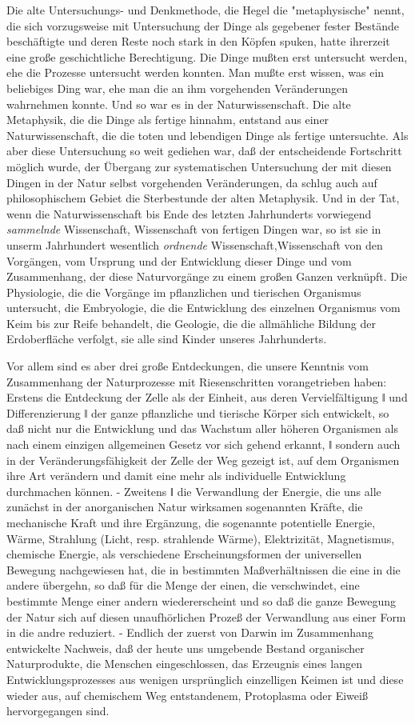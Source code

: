Die alte Untersuchungs- und Denkmethode, die Hegel die
"metaphysische" nennt, die sich vorzugsweise mit Untersuchung der Dinge
als gegebener fester Bestände beschäftigte und deren Reste noch stark in
den Köpfen spuken, hatte ihrerzeit eine große geschichtliche
Berechtigung. Die Dinge mußten erst untersucht werden, ehe die Prozesse
untersucht werden konnten. Man mußte erst wissen, was ein beliebiges
Ding war, ehe man die an ihm vorgehenden Veränderungen wahrnehmen
konnte. Und so war es in der Naturwissenschaft. Die alte Metaphysik, die
die Dinge als fertige hinnahm, entstand aus einer Naturwissenschaft, die
die toten und lebendigen Dinge als fertige untersuchte. Als aber diese
Untersuchung so weit gediehen war, daß der entscheidende Fortschritt
möglich wurde, der Übergang zur systematischen Untersuchung der mit
diesen Dingen in der Natur selbst vorgehenden Veränderungen, da schlug
auch auf philosophischem Gebiet die Sterbestunde der alten Metaphysik.
Und in der Tat, wenn die Naturwissenschaft bis Ende des letzten
Jahrhunderts vorwiegend \emph{sammelnde }Wissenschaft, Wissenschaft von
fertigen Dingen war, so ist sie in unserm Jahrhundert
wesentlich \emph{ordnende} Wissenschaft,Wissenschaft von den Vorgängen,
vom Ursprung und der Entwicklung dieser Dinge und vom Zusammenhang, der
diese Naturvorgänge zu einem großen Ganzen verknüpft. Die Physiologie,
die die Vorgänge im pflanzlichen und tierischen Organismus untersucht,
die Embryologie, die die Entwicklung des einzelnen Organismus vom Keim
bis zur Reife behandelt, die Geologie, die die allmähliche Bildung der
Erdoberfläche verfolgt, sie alle sind Kinder unseres Jahrhunderts.

Vor allem sind es aber drei große Entdeckungen, die unsere
Kenntnis vom Zusammenhang der Naturprozesse mit Riesenschritten
vorangetrieben haben: Erstens die Entdeckung der Zelle als der Einheit,
aus deren Vervielfältigung ǁ und Differenzierung ǁ der ganze pflanzliche
und tierische Körper sich entwickelt, so daß nicht nur die Entwicklung
und das Wachstum aller höheren Organismen als nach einem einzigen
allgemeinen Gesetz vor sich gehend erkannt, ǁ sondern auch in der
Veränderungsfähigkeit der Zelle
der Weg gezeigt ist, auf dem
Organismen ihre Art verändern und damit eine mehr als individuelle
Entwicklung durchmachen können. - Zweitens ǁ die Verwandlung der
Energie, die uns alle zunächst in der anorganischen Natur wirksamen
sogenannten Kräfte, die mechanische Kraft und ihre Ergänzung, die
sogenannte potentielle Energie, Wärme, Strahlung (Licht, resp.
strahlende Wärme), Elektrizität, Magnetismus, chemische Energie, als
verschiedene Erscheinungsformen der universellen Bewegung nachgewiesen
hat, die in bestimmten Maßverhältnissen die eine in die andere übergehn,
so daß für die Menge der einen, die verschwindet, eine bestimmte Menge
einer andern wiedererscheint und so daß die ganze Bewegung der Natur
sich auf diesen unaufhörlichen Prozeß der Verwandlung aus einer Form in
die andre reduziert. - Endlich der zuerst von Darwin im Zusammenhang
entwickelte Nachweis, daß der heute uns umgebende Bestand organischer
Naturprodukte, die Menschen eingeschlossen, das Erzeugnis eines langen
Entwicklungsprozesses aus wenigen ursprünglich einzelligen Keimen ist
und diese wieder aus, auf chemischem Weg entstandenem, Protoplasma oder
Eiweiß hervorgegangen sind.

